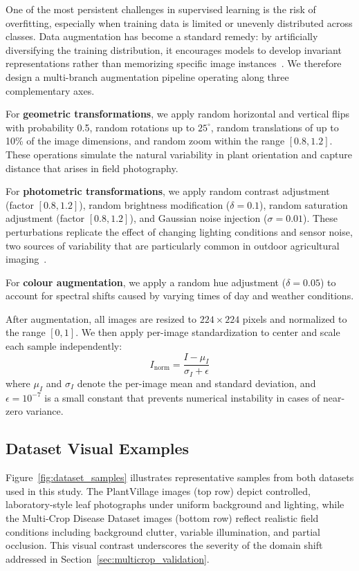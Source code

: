 \documentclass[pdflatex,sn-basic]{sn-jnl}
\begin{document}
One of the most persistent challenges in supervised learning is the risk of overfitting, especially when training data is limited or unevenly distributed across classes. Data augmentation has become a standard remedy: by artificially diversifying the training distribution, it encourages models to develop invariant representations rather than memorizing specific image instances~\cite{shorten2019survey}. We therefore design a multi-branch augmentation pipeline operating along three complementary axes.

For \textbf{geometric transformations}, we apply random horizontal and vertical flips with probability 0.5, random rotations up to $25^\circ$, random translations of up to 10\% of the image dimensions, and random zoom within the range $[0.8, 1.2]$. These operations simulate the natural variability in plant orientation and capture distance that arises in field photography.

For \textbf{photometric transformations}, we apply random contrast adjustment (factor $[0.8, 1.2]$), random brightness modification ($\delta = 0.1$), random saturation adjustment (factor $[0.8, 1.2]$), and Gaussian noise injection ($\sigma = 0.01$). These perturbations replicate the effect of changing lighting conditions and sensor noise, two sources of variability that are particularly common in outdoor agricultural imaging~\cite{mohanty2016using}.

For \textbf{colour augmentation}, we apply a random hue adjustment ($\delta = 0.05$) to account for spectral shifts caused by varying times of day and weather conditions.

After augmentation, all images are resized to $224 \times 224$ pixels and normalized to the range $[0, 1]$. We then apply per-image standardization to center and scale each sample independently:
\begin{equation}
    I_{\text{norm}} = \frac{I - \mu_I}{\sigma_I + \epsilon}
    \label{eq:normalization}
\end{equation}
where $\mu_I$ and $\sigma_I$ denote the per-image mean and standard deviation, and $\epsilon = 10^{-7}$ is a small constant that prevents numerical instability in cases of near-zero variance.
\subsection{Dataset Visual Examples}
\label{sec:dataset_examples}

Figure~\ref{fig:dataset_samples} illustrates representative samples from both 
datasets used in this study. The PlantVillage images (top row) depict controlled, 
laboratory-style leaf photographs under uniform background and lighting, while the 
Multi-Crop Disease Dataset images (bottom row) reflect realistic field conditions 
including background clutter, variable illumination, and partial occlusion. This 
visual contrast underscores the severity of the domain shift addressed in 
Section~\ref{sec:multicrop_validation}.
\end{document}

